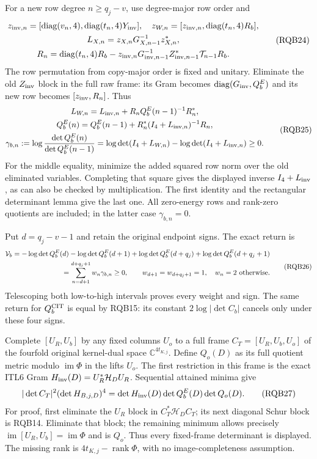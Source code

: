 \documentclass[10pt]{article}
\begin{document}
For a new row degree $n\ge q_j-v$, use degree-major row order and
\[
\begin{gathered}
 z_{{\rm inv},n}=[\operatorname{diag}(v_n,4),
                       \operatorname{diag}(t_n,4)Y_{\rm inv}],
 \quad z_{W,n}=[z_{{\rm inv},n},\operatorname{diag}(t_n,4)R_b],\\
 L_{X,n}=z_{X,n}G_{X,n-1}^{-1}z_{X,n}^*,\\
 R_n=\operatorname{diag}(t_n,4)R_b
 -z_{{\rm inv},n}G_{{\rm inv},n-1}^{-1}
                   Z_{{\rm inv},n-1}^*\mathcal T_{n-1}R_b .
\end{gathered}\tag{RQB24}
\]
The row permutation from copy-major order is fixed and unitary.
Eliminate the old $Z_{\rm inv}$ block in the full raw frame:
its Gram becomes $\operatorname{diag}(G_{\rm inv},Q_b^E)$
and its new row becomes $[z_{\rm inv},R_n]$. Thus
\[
\begin{gathered}
 L_{W,n}=L_{{\rm inv},n}
                    +R_nQ_b^E(n-1)^{-1}R_n^*,\\
 Q_b^E(n)=Q_b^E(n-1)
           +R_n^*(I_4+L_{{\rm inv},n})^{-1}R_n,\\
 \gamma_{b,n}:=\log\frac{\det Q_b^E(n)}{\det Q_b^E(n-1)}
       =\log\det(I_4+L_{W,n})-\log\det(I_4+L_{{\rm inv},n})
       \ge0 .
\end{gathered}\tag{RQB25}
\]
For the middle equality, minimize the added squared row norm over
the old eliminated variables. Completing that square gives the
displayed inverse $I_4+L_{\rm inv}$, as can also be checked by
multiplication. The first identity and the rectangular determinant
lemma give the last one. All zero-energy rows and rank-zero
quotients are included; in the latter case $\gamma_{b,n}=0$.

Put $d=q_j-v-1$ and retain the original endpoint signs. The exact return is
\[
\begin{gathered}
 \mathcal V_b=-\log\det Q_b^E(d)-\log\det Q_b^E(d+1)
              +\log\det Q_b^E(d+q_j)+\log\det Q_b^E(d+q_j+1)\\
 \hfill=\sum_{n=d+1}^{d+q_j+1}w_n\gamma_{b,n}\ge0,\qquad
 w_{d+1}=w_{d+q_j+1}=1,\quad w_n=2\ \hbox{otherwise}.
\end{gathered}\tag{RQB26}
\]
Telescoping both low-to-high intervals proves every weight and sign.
The same return for $Q_b^{\rm CIT}$ is equal by RQB15: its
constant $2\log|\det C_b|$ cancels only under these four signs.

Complete $[U_R,U_b]$ by any fixed columns $U_o$ to a full frame
$C_T=[U_R,U_b,U_o]$ of the fourfold original kernel-dual space
$\mathbb C^{4t_{K,j}}$. Define $Q_o(D)$ as its full quotient metric
modulo $\operatorname{im}\Phi$ in the lifts $U_o$.
The first restriction in this frame is the exact ITL6 Gram
$H_{\rm inv}(D)=U_R^*\mathcal H_DU_R$. Sequential attained minima give
\[
 |\det C_T|^2(\det H_{B,j,D})^4
       =\det H_{\rm inv}(D)\det Q_b^E(D)\det Q_o(D).
 \tag{RQB27}
\]
For proof, first eliminate the $U_R$ block in
$C_T^*\mathcal H_DC_T$; its next diagonal Schur block is RQB14.
Eliminate that block; the remaining minimum allows precisely
$\operatorname{im}[U_R,U_b]=\operatorname{im}\Phi$ and is $Q_o$.
Thus every fixed-frame determinant is displayed. The missing rank is
$4t_{K,j}-\operatorname{rank}\Phi$, with no image-completeness assumption.
\end{document}
